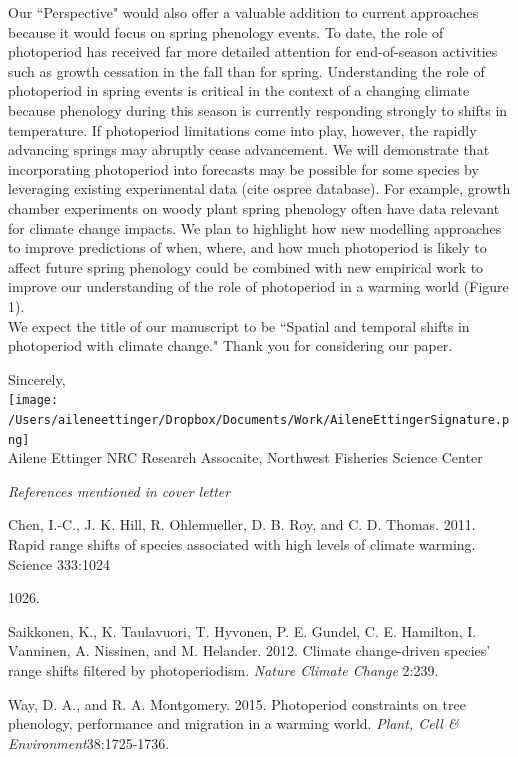\documentclass[11pt,a4paper]{letter}
\begin{document}
\begin{letter}{}
Our ``Perspective" would also offer a valuable addition to current approaches because it would focus on spring phenology events. To date, the role of photoperiod has received far more detailed attention for end-of-season activities such as growth cessation in the fall than for spring. Understanding the role of photoperiod in spring events  is critical in the context of a changing climate because phenology during this season is currently responding strongly to shifts in temperature. If photoperiod limitations come into play, however, the rapidly advancing springs may abruptly cease advancement. We will demonstrate that incorporating photoperiod into forecasts may be possible for some species by leveraging existing experimental data (cite ospree database). For example, growth chamber experiments on woody plant spring phenology often have data relevant for climate change impacts. We plan to highlight how new modelling approaches to improve predictions of when, where, and how much photoperiod is likely to affect future spring phenology could be combined with new empirical work to improve our understanding of the role of photoperiod in a warming world (Figure 1).
\\
We expect the title of our manuscript to be ``Spatial and temporal shifts in photoperiod with climate change."  Thank you for considering our paper.

Sincerely,\\

\texttt{[image: /Users/aileneettinger/Dropbox/Documents/Work/AileneEttingerSignature.png]} \\
Ailene Ettinger
NRC Research Assocaite, Northwest Fisheries Science Center

\noindent \emph{References mentioned in cover letter}
\begin{footnotesize}
\begin{enumerate}
\item Chen, I.-C., J. K. Hill, R. Ohlemueller, D. B. Roy, and C. D. Thomas. 2011. Rapid range shifts of species associated with high levels of climate warming. Science 333:1024{1026.

\item Saikkonen, K., K. Taulavuori, T. Hyvonen, P. E. Gundel, C. E. Hamilton, I. Vanninen, A. Nissinen, and M. Helander. 2012. Climate change-driven species' range shifts filtered by photoperiodism. \emph{Nature Climate Change} 2:239.

\item Way, D. A., and R. A. Montgomery. 2015. Photoperiod constraints on tree phenology, performance and migration in a warming world. \emph{Plant, Cell \& Environment}38:1725-1736.

}
\end{enumerate}
\end{footnotesize}
\end{letter}
\end{document}
